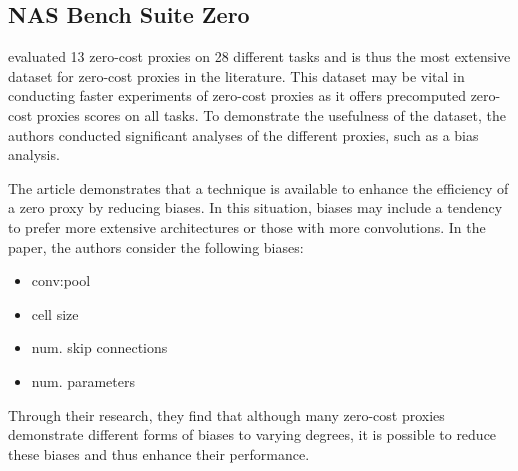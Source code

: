 \subsection{NAS Bench Suite Zero}
\cite{krishnakumar2022bench} evaluated 13 zero-cost proxies on 28 different tasks and is thus the most extensive dataset for zero-cost proxies in the literature. This dataset may be vital in conducting faster experiments of zero-cost proxies as it offers precomputed zero-cost proxies scores on all tasks. To demonstrate the usefulness of the dataset, the authors conducted significant analyses of the different proxies, such as a bias analysis. 

The article demonstrates that a technique is available to enhance the efficiency of a zero proxy by reducing biases. In this situation, biases may include a tendency to prefer more extensive architectures or those with more convolutions. In the paper, the authors consider the following biases: 
\begin{itemize}
    \item{conv:pool}
    \item{cell size}
    \item{num. skip connections}
    \item{num. parameters}
\end{itemize}

Through their research, they find that although many zero-cost proxies demonstrate different forms of biases to varying degrees, it is possible to reduce these biases and thus enhance their performance.